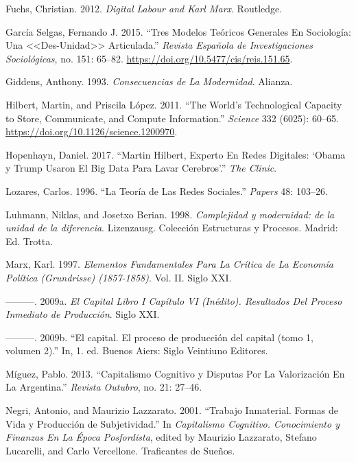\documentclass[
]{interact}
\newlength{\cslhangindent}
\newenvironment{CSLReferences}[2] %
 {\begin{list}{}{%
  \setlength{\itemindent}{0pt}
  \setlength{\leftmargin}{0pt}
  \setlength{\parsep}{0pt}
  \ifodd #1
   \setlength{\leftmargin}{\cslhangindent}
   \setlength{\itemindent}{-1\cslhangindent}
  \fi
  \setlength{\itemsep}{#2\baselineskip}}}
 {\end{list}}
\begin{document}
\begin{CSLReferences}{1}{0}
Fuchs, Christian. 2012. \emph{Digital {Labour} and {Karl Marx}}.
Routledge.

García Selgas, Fernando J. 2015. {``Tres Modelos Teóricos Generales En
{Sociología}: Una
\textless\textless Des-Unidad\textgreater\textgreater{} Articulada.''}
\emph{Revista Española de Investigaciones Sociológicas}, no. 151:
65--82. \url{https://doi.org/10.5477/cis/reis.151.65}.

Giddens, Anthony. 1993. \emph{Consecuencias de La Modernidad}. Alianza.

Hilbert, Martin, and Priscila López. 2011. {``The World's Technological
Capacity to Store, Communicate, and Compute Information.''}
\emph{Science} 332 (6025): 60--65.
\url{https://doi.org/10.1126/science.1200970}.

Hopenhayn, Daniel. 2017. {``Martin {Hilbert}, Experto En Redes
Digitales: {`{Obama} y {Trump} Usaron El Big Data Para Lavar
Cerebros'}.''} \emph{The Clinic}.

Lozares, Carlos. 1996. {``La Teoría de Las Redes Sociales.''}
\emph{Papers} 48: 103--26.

Luhmann, Niklas, and Josetxo Berian. 1998. \emph{{Complejidad y
modernidad: de la unidad de la diferencia}}. Lizenzausg. {Colección
Estructuras y Procesos}. Madrid: Ed. Trotta.

Marx, Karl. 1997. \emph{Elementos Fundamentales Para La Crítica de La
Economía Política ({Grundrisse}) (1857-1858)}. Vol. II. Siglo XXI.

---------. 2009a. \emph{El {Capital Libro I Capítulo VI} (Inédito).
{Resultados} Del Proceso Inmediato de Producción}. Siglo XXI.

---------. 2009b. {``{El capital. El proceso de producción del capital
(tomo 1, volumen 2)}.''} In, 1. ed. Buenos Aiers: Siglo Veintiuno
Editores.

Míguez, Pablo. 2013. {``Capitalismo Cognitivo y Disputas Por La
Valorización En La {Argentina}.''} \emph{Revista Outubro}, no. 21:
27--46.

Negri, Antonio, and Maurizio Lazzarato. 2001. {``Trabajo Inmaterial.
{Formas} de Vida y Producción de Subjetividad.''} In \emph{Capitalismo
Cognitivo. {Conocimiento} y Finanzas En La Época Posfordista}, edited by
Maurizio Lazzarato, Stefano Lucarelli, and Carlo Vercellone. Traficantes
de Sueños.


\end{CSLReferences}
\end{document}

